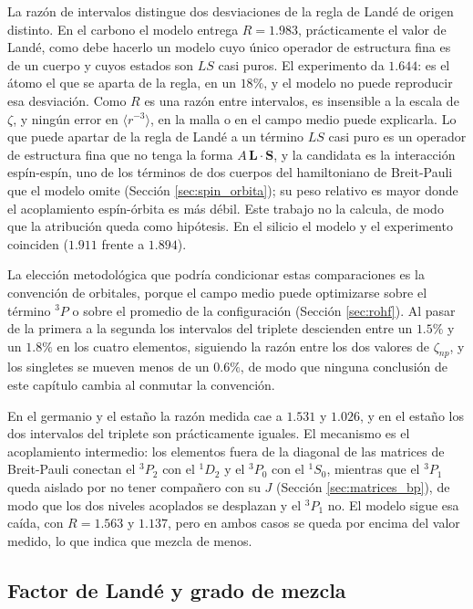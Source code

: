 La razón de intervalos distingue dos desviaciones de la regla de Landé de origen distinto. En el carbono el modelo entrega $R = 1.983$, prácticamente el valor de Landé, como debe hacerlo un modelo cuyo único operador de estructura fina es de un cuerpo y cuyos estados son $LS$ casi puros. El experimento da $1.644$: es el átomo el que se aparta de la regla, en un $18\%$, y el modelo no puede reproducir esa desviación. Como $R$ es una razón entre intervalos, es insensible a la escala de $\zeta$, y ningún error en $\langle r^{-3}\rangle$, en la malla o en el campo medio puede explicarla. Lo que puede apartar de la regla de Landé a un término $LS$ casi puro es un operador de estructura fina que no tenga la forma $A\,\mathbf{L}\cdot\mathbf{S}$, y la candidata es la interacción espín-espín, uno de los términos de dos cuerpos del hamiltoniano de Breit-Pauli que el modelo omite (Sección \ref{sec:spin_orbita}); su peso relativo es mayor donde el acoplamiento espín-órbita es más débil. Este trabajo no la calcula, de modo que la atribución queda como hipótesis. En el silicio el modelo y el experimento coinciden ($1.911$ frente a $1.894$).

La elección metodológica que podría condicionar estas comparaciones es la convención de orbitales, porque el campo medio puede optimizarse sobre el término $^3P$ o sobre el promedio de la configuración (Sección \ref{sec:rohf}). Al pasar de la primera a la segunda los intervalos del triplete descienden entre un $1.5\%$ y un $1.8\%$ en los cuatro elementos, siguiendo la razón entre los dos valores de $\zeta_{np}$, y los singletes se mueven menos de un $0.6\%$, de modo que ninguna conclusión de este capítulo cambia al conmutar la convención.

En el germanio y el estaño la razón medida cae a $1.531$ y $1.026$, y en el estaño los dos intervalos del triplete son prácticamente iguales. El mecanismo es el acoplamiento intermedio: los elementos fuera de la diagonal de las matrices de Breit-Pauli conectan el $^3P_2$ con el $^1D_2$ y el $^3P_0$ con el $^1S_0$, mientras que el $^3P_1$ queda aislado por no tener compañero con su $J$ (Sección \ref{sec:matrices_bp}), de modo que los dos niveles acoplados se desplazan y el $^3P_1$ no. El modelo sigue esa caída, con $R = 1.563$ y $1.137$, pero en ambos casos se queda por encima del valor medido, lo que indica que mezcla de menos.

\subsection{Factor de Landé y grado de mezcla}
\label{sec:lande}

